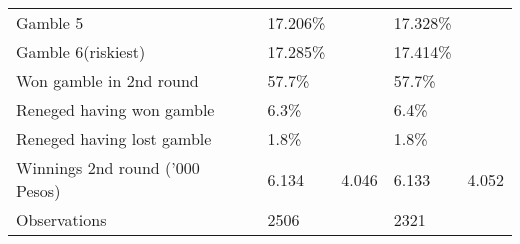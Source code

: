 \documentclass[]{elsarticle} %
\begin{document}
\begin{table}[!h]
\begin{tabular}{llllll}
\hspace{1em}Gamble 5 &  & 17.206\% &  & 17.328\% & \\
\hspace{1em}Gamble 6(riskiest) &  & 17.285\% &  & 17.414\% & \\
Won gamble in 2nd round &  & 57.7\% &  & 57.7\% & \\
Reneged having won gamble &  & 6.3\% &  & 6.4\% & \\
Reneged having lost gamble &  & 1.8\% &  & 1.8\% & \\
Winnings 2nd round ('000 Pesos) &  & 6.134 & 4.046 & 6.133 & 4.052\\
Observations &  & 2506 &  & 2321 & \\
\bottomrule
\end{tabular}
\endgroup{}
\end{table}
\end{document}
